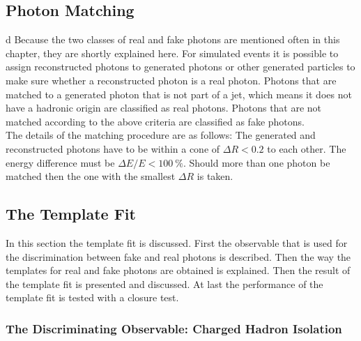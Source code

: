 \subsection{Photon Matching}
d
Because the two classes of real and fake photons are mentioned often in this chapter, they are shortly explained here. For simulated events it is possible to assign reconstructed photons to generated photons or other generated particles to make sure whether a reconstructed photon is a real photon. Photons that are matched to a generated photon that is not part of a jet, which means it does not have a hadronic origin are classified as real photons. Photons that are not matched according to the above criteria are classified as fake photons.\\
The details of the matching procedure are as follows: The generated and reconstructed photons have to be within a cone of $\Delta R < 0.2$ to each other. The energy difference must be $\Delta E / E < \SI{100}{\percent}$. Should more than one photon be matched then the one with the smallest $\Delta R$ is taken.  

\subsection{The Template Fit}

In this section the template fit is discussed. First the observable that is used for the discrimination between fake and real photons is described. Then the way the templates for real and fake photons are obtained is explained. Then the result of the template fit is presented and discussed. At last the performance of the template fit is tested with a closure test. \\

\subsubsection{The Discriminating Observable: Charged Hadron Isolation}

